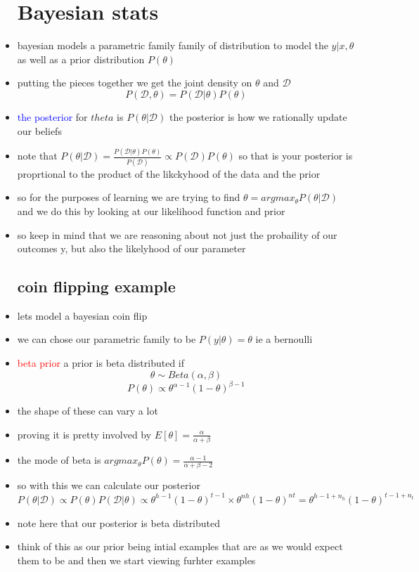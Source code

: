 \documentclass{article}
\begin{document}
\begin{itemize}
\section*{Bayesian stats}
\item bayesian models a parametric family family of distribution to model the $y|x,\theta$ as well as a prior distribution $P(\theta)$
\item putting the pieces together we get the joint density on $\theta$ and $\mathcal{D}$ $$P(\mathcal{D},\theta)=P(\mathcal{D}|\theta)P(\theta)$$
\item \textcolor{blue}{the posterior} for $theta$ is $P(\theta|\mathcal{D})$ the posterior is how we rationally update our beliefs
\item note that $P(\theta|\mathcal{D})=\frac{P(\mathcal
D|\theta)P(\theta)}{P(\mathcal{D})}\propto P(\mathcal{D})P(\theta)$ so that is your posterior is proprtional to the product of the likckyhood of the data and the prior  
\item so for the purposes of learning we are trying to find $\theta=argmax_{\theta}P(\theta|\mathcal{D})$ and we do this by looking at our likelihood function and prior
\item so keep in mind that we are reasoning about not just the probaility of our outcomes y, but also the likelyhood of our parameter 
\subsection*{coin flipping example}
\item lets model a bayesian coin flip 
\item we can chose our parametric family to be  $P(y|\theta)=\theta$ ie a bernoulli
\item \textcolor{red}{beta prior} a prior is beta distributed if $$\theta\sim Beta(\alpha, \beta)$$ $$P(\theta)\propto \theta^{\alpha-1}(1-\theta)^{\beta-1}$$
\item the shape of these can vary a lot 
\item proving it is pretty involved by $E[\theta]=\frac{\alpha}{\alpha+\beta}$
\item the mode of beta is $argmax_{\theta}P(\theta)=\frac{\alpha-1}{\alpha+\beta-2}$
\item so with this we can calculate our posterior $P(\theta|\mathcal{D})\propto P(\theta)P(\mathcal{D}|\theta)\propto \theta^{h-1}(1-\theta)^{t-1}\times \theta^{nh}(1-\theta)^{nt}=\theta^{h-1+n_h}(1-\theta)^{t-1+n_t}$
\item note here that our posterior is beta distributed
\item think of this as our prior being intial examples that are as we would expect them to be and then we start viewing furhter examples

\end{itemize}
\end{document}
